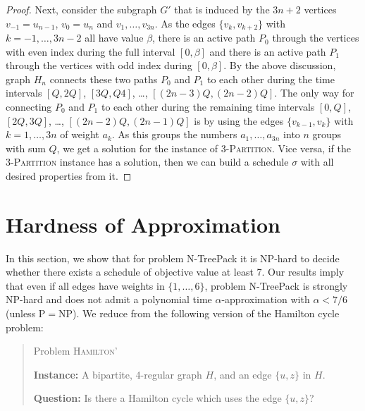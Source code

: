 \documentclass[runningheads]{llncs}
\newcommand{\set}[1]{\{ #1 \}}
\newcommand{\fromto}[2]{\set{#1, \ldots, #2}}
\newcommand{\xxxNTP}{{\sc N-TreePack}}
\begin{document}
\begin{proof}
Next, consider the subgraph $G'$ that is induced by the $3n+2$ vertices $v_{-1}=u_{n-1}$, $v_0=u_n$ and 
$v_1,\ldots,v_{3n}$.
As the edges $\{v_k, v_{k+2}\}$ with $k=-1,\ldots,3n-2$ all have value $\beta$, there is an active path $P_0$ 
through the vertices with even index during the full interval $[0,\beta]$ and there is an active 
path $P_1$ through the vertices with odd index during $[0, \beta]$.
By the above discussion, graph $H_n$ connects these two paths $P_0$ and $P_1$ to each other during the
time intervals $[Q,2Q]$, $[3Q,Q4]$, \dots, $[(2n-3)Q,(2n-2)Q]$.
The only way for connecting $P_0$ and $P_1$ to each other during the remaining time intervals 
$[0,Q]$, $[2Q,3Q]$, \dots, $[(2n-2)Q,(2n-1)Q]$ is by using the edges $\{v_{k-1},v_k\}$ with $k=1,\ldots,3n$ of 
weight $a_k$.
As this groups the numbers $a_1,\ldots,a_{3n}$ into $n$ groups with sum $Q$, we get a solution
for the instance of \textsc{3-Partition}.
Vice versa, if the \textsc{3-Partition} instance has a solution, then we can build a schedule $\sigma$
with all desired properties from it.
\end{proof}

\section{Hardness of Approximation}
\label{sec:inapprox}

In this section, we show that for problem {\xxxNTP} it is NP-hard to decide whether there exists a schedule of objective value at least 7. Our results imply that even if all edges have weights in $\fromto{1}{6}$, problem {\xxxNTP} is strongly NP-hard and  does not admit a polynomial time $\alpha$-approximation with $\alpha < 7/6$ (unless P$=$NP).
We reduce from the following version of the Hamilton cycle problem:

\begin{quote}

Problem \textsc{Hamilton'} 

\textbf{Instance:} A bipartite, 4-regular graph $H$, and an edge $\set{u, z}$ in $H$.

\textbf{Question:} Is there a Hamilton cycle which uses the edge $\set{u, z}$?

\end{quote}
\end{document}
